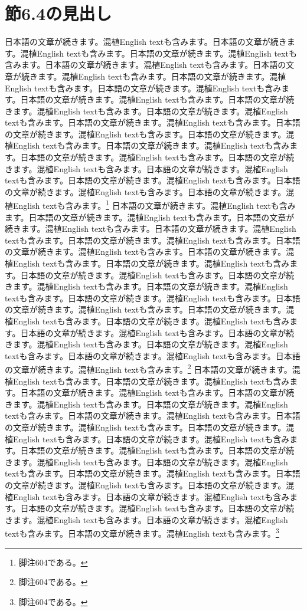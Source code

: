 \documentclass[pdflatex,book]{jlreq}
\begin{document}
\section{節6.4の見出し}
日本語の文章が続きます。混植English textも含みます。日本語の文章が続きます。混植English textも含みます。日本語の文章が続きます。混植English textも含みます。日本語の文章が続きます。混植English textも含みます。日本語の文章が続きます。混植English textも含みます。日本語の文章が続きます。混植English textも含みます。日本語の文章が続きます。混植English textも含みます。日本語の文章が続きます。混植English textも含みます。日本語の文章が続きます。混植English textも含みます。日本語の文章が続きます。混植English textも含みます。日本語の文章が続きます。混植English textも含みます。日本語の文章が続きます。混植English textも含みます。日本語の文章が続きます。混植English textも含みます。日本語の文章が続きます。混植English textも含みます。日本語の文章が続きます。混植English textも含みます。日本語の文章が続きます。混植English textも含みます。日本語の文章が続きます。混植English textも含みます。日本語の文章が続きます。混植English textも含みます。日本語の文章が続きます。混植English textも含みます。日本語の文章が続きます。混植English textも含みます。\footnote{脚注604である。}
日本語の文章が続きます。混植English textも含みます。日本語の文章が続きます。混植English textも含みます。日本語の文章が続きます。混植English textも含みます。日本語の文章が続きます。混植English textも含みます。日本語の文章が続きます。混植English textも含みます。日本語の文章が続きます。混植English textも含みます。日本語の文章が続きます。混植English textも含みます。日本語の文章が続きます。混植English textも含みます。日本語の文章が続きます。混植English textも含みます。日本語の文章が続きます。混植English textも含みます。日本語の文章が続きます。混植English textも含みます。日本語の文章が続きます。混植English textも含みます。日本語の文章が続きます。混植English textも含みます。日本語の文章が続きます。混植English textも含みます。日本語の文章が続きます。混植English textも含みます。日本語の文章が続きます。混植English textも含みます。日本語の文章が続きます。混植English textも含みます。日本語の文章が続きます。混植English textも含みます。日本語の文章が続きます。混植English textも含みます。日本語の文章が続きます。混植English textも含みます。\footnote{脚注604である。}
日本語の文章が続きます。混植English textも含みます。日本語の文章が続きます。混植English textも含みます。日本語の文章が続きます。混植English textも含みます。日本語の文章が続きます。混植English textも含みます。日本語の文章が続きます。混植English textも含みます。日本語の文章が続きます。混植English textも含みます。日本語の文章が続きます。混植English textも含みます。日本語の文章が続きます。混植English textも含みます。日本語の文章が続きます。混植English textも含みます。日本語の文章が続きます。混植English textも含みます。日本語の文章が続きます。混植English textも含みます。日本語の文章が続きます。混植English textも含みます。日本語の文章が続きます。混植English textも含みます。日本語の文章が続きます。混植English textも含みます。日本語の文章が続きます。混植English textも含みます。日本語の文章が続きます。混植English textも含みます。日本語の文章が続きます。混植English textも含みます。日本語の文章が続きます。混植English textも含みます。日本語の文章が続きます。混植English textも含みます。日本語の文章が続きます。混植English textも含みます。\footnote{脚注604である。}
\end{document}
